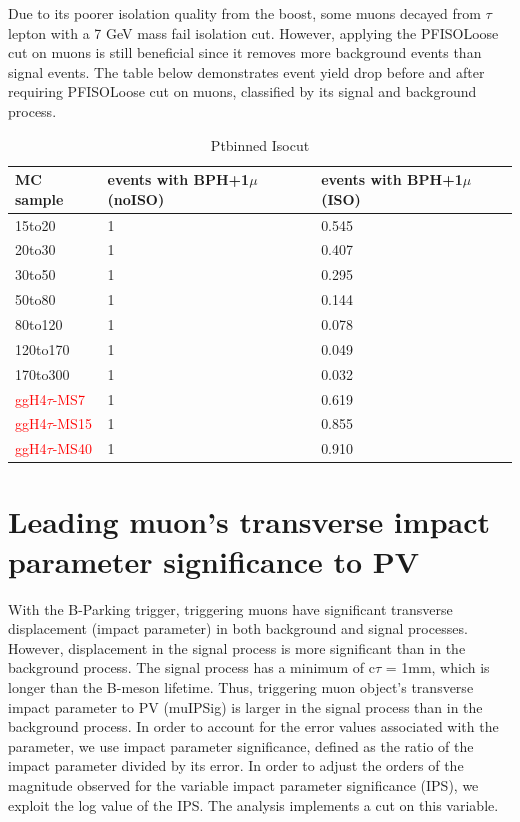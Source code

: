 Due to its poorer isolation quality from the boost, some muons decayed from $\tau$ lepton with a 7 GeV mass fail isolation cut.
However, applying the PFISOLoose cut on muons is still beneficial since it removes more background events than signal events.
The table below demonstrates event yield drop before and after requiring PFISOLoose cut on muons, classified by its signal and background process.


\begin{tiny}
    \begin{table}
  \centering
\begin{tabular}{|p{3cm}|p{2cm}|p{2cm}|}
\hline
MC sample & events with BPH+1$\mu$ (noISO) & events with BPH+1$\mu$ (ISO) \\
\hline
 15to20 & 1 & 0.545 \\
 \hline
 20to30 & 1 & 0.407 \\
\hline
 30to50 & 1 & 0.295 \\
\hline
 50to80 & 1 & 0.144 \\
\hline
 80to120 & 1 & 0.078 \\
\hline
120to170 & 1 & 0.049 \\
\hline
170to300 & 1 & 0.032 \\
\hline
\textcolor{red}{ggH4$\tau$-MS7}& 1 & 0.619 \\
\hline
\textcolor{red}{ggH4$\tau$-MS15} & 1 & 0.855 \\
\hline
\textcolor{red}{ggH4$\tau$-MS40} & 1 & 0.910 \\
 \hline
    \end{tabular}
    \caption{Ptbinned Isocut}
    \end{table}
\end{tiny}    


\section{Leading muon's transverse impact parameter significance to PV}\label{ref:muIP}

With the B-Parking trigger, triggering muons have significant transverse displacement (impact parameter) in both background and signal processes.
However, displacement in the signal process is more significant than in the background process.
The signal process has a minimum of c$\tau$ = 1mm, which is longer than the B-meson lifetime.
Thus, triggering muon object's transverse impact parameter to PV (muIPSig) is larger in the signal process than in the background process.
In order to account for the error values associated with the parameter, we use impact parameter significance, defined as the ratio of the impact parameter divided by its error.
In order to adjust the orders of the magnitude observed for the variable impact parameter significance (IPS), we exploit the log value of the IPS.
The analysis implements a cut on this variable.


